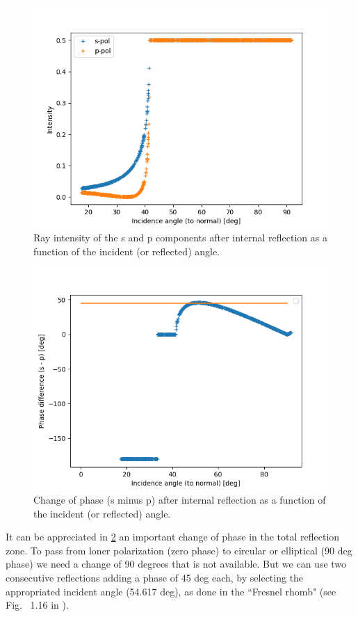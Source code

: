\documentclass{iucr}
\begin{document}
\begin{figure}\label{fig:internalR}
\centering
\includegraphics[width=0.95\linewidth]{figures/internalR.png}
\caption{Ray intensity of the s and p components after internal reflection as a function of the incident (or reflected) angle.}
\end{figure}

\begin{figure}\label{fig:internalPhase}
\centering
\includegraphics[width=0.95\linewidth]{figures/internalPhase.png}
\caption{Change of phase (s minus p) after internal reflection as a function of the incident (or reflected) angle.}
\end{figure}

It can be appreciated in \ref{fig:internalPhase} an important change of phase in the total reflection zone. To pass from loner polarization (zero phase) to circular or elliptical (90 deg phase) we need a change of 90 degrees that is not available. But we can use two consecutive reflections adding a phase of 45 deg each, by selecting the appropriated incident angle (54.617 deg), as done in the ``Fresnel rhomb" (see Fig.~ 1.16 in \cite{born_wolf}).
\end{document}
